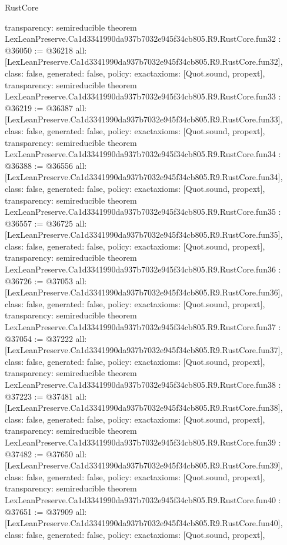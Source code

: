 \begin{lexlean}{RustCore}
\begin{coremodule}
{  transparency: semireducible
}
theorem LexLeanPreserve.Ca1d3341990da937b7032e945f34cb805.R9.RustCore.fun32 : @36050 := @36218 {
  all: [LexLeanPreserve.Ca1d3341990da937b7032e945f34cb805.R9.RustCore.fun32],
  class: false,
  generated: false,
  policy: exact{axioms: [Quot.sound, propext]},
  transparency: semireducible
}
theorem LexLeanPreserve.Ca1d3341990da937b7032e945f34cb805.R9.RustCore.fun33 : @36219 := @36387 {
  all: [LexLeanPreserve.Ca1d3341990da937b7032e945f34cb805.R9.RustCore.fun33],
  class: false,
  generated: false,
  policy: exact{axioms: [Quot.sound, propext]},
  transparency: semireducible
}
theorem LexLeanPreserve.Ca1d3341990da937b7032e945f34cb805.R9.RustCore.fun34 : @36388 := @36556 {
  all: [LexLeanPreserve.Ca1d3341990da937b7032e945f34cb805.R9.RustCore.fun34],
  class: false,
  generated: false,
  policy: exact{axioms: [Quot.sound, propext]},
  transparency: semireducible
}
theorem LexLeanPreserve.Ca1d3341990da937b7032e945f34cb805.R9.RustCore.fun35 : @36557 := @36725 {
  all: [LexLeanPreserve.Ca1d3341990da937b7032e945f34cb805.R9.RustCore.fun35],
  class: false,
  generated: false,
  policy: exact{axioms: [Quot.sound, propext]},
  transparency: semireducible
}
theorem LexLeanPreserve.Ca1d3341990da937b7032e945f34cb805.R9.RustCore.fun36 : @36726 := @37053 {
  all: [LexLeanPreserve.Ca1d3341990da937b7032e945f34cb805.R9.RustCore.fun36],
  class: false,
  generated: false,
  policy: exact{axioms: [Quot.sound, propext]},
  transparency: semireducible
}
theorem LexLeanPreserve.Ca1d3341990da937b7032e945f34cb805.R9.RustCore.fun37 : @37054 := @37222 {
  all: [LexLeanPreserve.Ca1d3341990da937b7032e945f34cb805.R9.RustCore.fun37],
  class: false,
  generated: false,
  policy: exact{axioms: [Quot.sound, propext]},
  transparency: semireducible
}
theorem LexLeanPreserve.Ca1d3341990da937b7032e945f34cb805.R9.RustCore.fun38 : @37223 := @37481 {
  all: [LexLeanPreserve.Ca1d3341990da937b7032e945f34cb805.R9.RustCore.fun38],
  class: false,
  generated: false,
  policy: exact{axioms: [Quot.sound, propext]},
  transparency: semireducible
}
theorem LexLeanPreserve.Ca1d3341990da937b7032e945f34cb805.R9.RustCore.fun39 : @37482 := @37650 {
  all: [LexLeanPreserve.Ca1d3341990da937b7032e945f34cb805.R9.RustCore.fun39],
  class: false,
  generated: false,
  policy: exact{axioms: [Quot.sound, propext]},
  transparency: semireducible
}
theorem LexLeanPreserve.Ca1d3341990da937b7032e945f34cb805.R9.RustCore.fun40 : @37651 := @37909 {
  all: [LexLeanPreserve.Ca1d3341990da937b7032e945f34cb805.R9.RustCore.fun40],
  class: false,
  generated: false,
  policy: exact{axioms: [Quot.sound, propext]},
}
\end{coremodule}
\end{lexlean}
